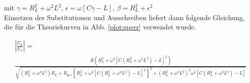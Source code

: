 mit $\gamma=R_L^2+\omega^2L^2$, $\epsilon=\omega[C\gamma-L]$, $\beta=R_L^2 + \epsilon^2$\\

Einsetzen der Substitutionen und Ausschreiben liefert dann folgende Gleichung, die für die Theoriekurven in Abb. \ref{plot:sperr} verwendet wurde.

\footnotesize
\begin{align}
&\left| \frac{U_a}{U_e} \right| =  \\
&\frac{R\left(R^2_L+\omega ^2\left[C\left(R^2_L+\omega ^2 L^2 \right) - L\right] ^2 \right)}{\sqrt{ \left( R^2_L + \omega ^2L^2\right) R_L+R_{ges}\left\{ R_L^2+\omega ^2\left[ C\left( R_L^2+\omega ^2L^2\right) -L\right] ^2\right\}^2+\left(R^2_L+\omega^2L^2\right)^2\omega^2\left[C\left(R^2_L+\omega^2L^2\right)-L\right]}}\nonumber
\end{align}
\normalsize
